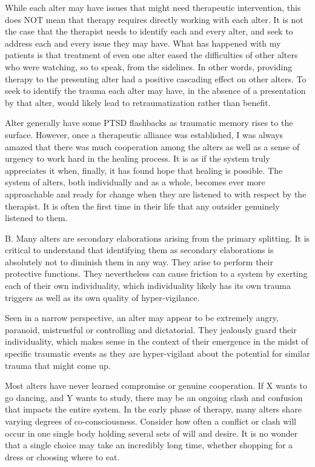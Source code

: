 \documentclass[]{book}
\begin{document}
While each alter may have issues that might need therapeutic intervention, this does NOT mean that therapy requires directly working with each alter. It is not the case that the therapist needs to identify each and every alter, and seek to address each and every issue they may have. What has happened with my patients is that treatment of even one alter eased the difficulties of other alters who were watching, so to speak, from the sidelines. In other words, providing therapy to the presenting alter had a positive cascading effect on other alters. To seek to identify the trauma each alter may have, in the absence of a presentation by that alter, would likely lead to retraumatization rather than benefit.

Alter generally have some PTSD flashbacks as traumatic memory rises to the surface. However, once a therapeutic alliance was established, I was always amazed that there was much cooperation among the alters as well as a sense of urgency to work hard in the healing process. It is as if the system truly appreciates it when, finally, it has found hope that healing is possible. The system of alters, both individually and as a whole, becomes ever more approachable and ready for change when they are listened to with respect by the therapist. It is often the first time in their life that any outsider genuinely listened to them.

B. Many alters are secondary elaborations arising from the primary splitting. It is critical to understand that identifying them as secondary elaborations is absolutely not to diminish them in any way. They arise to perform their protective functions. They nevertheless can cause friction to a system by exerting each of their own individuality, which individuality likely has its own trauma triggers as well as its own quality of hyper-vigilance.

Seen in a narrow perspective, an alter may appear to be extremely angry, paranoid, mistrustful or controlling and dictatorial. They jealously guard their individuality, which makes sense in the context of their emergence in the midst of specific traumatic events as they are hyper-vigilant about the potential for similar trauma that might come up.

Most alters have never learned compromise or genuine cooperation. If X wants to go dancing, and Y wants to study, there may be an ongoing clash and confusion that impacts the entire system. In the early phase of therapy, many alters share varying degrees of co-consciousness. Consider how often a conflict or clash will occur in one single body holding several sets of will and desire. It is no wonder that a single choice may take an incredibly long time, whether shopping for a dress or choosing where to eat.
\end{document}
